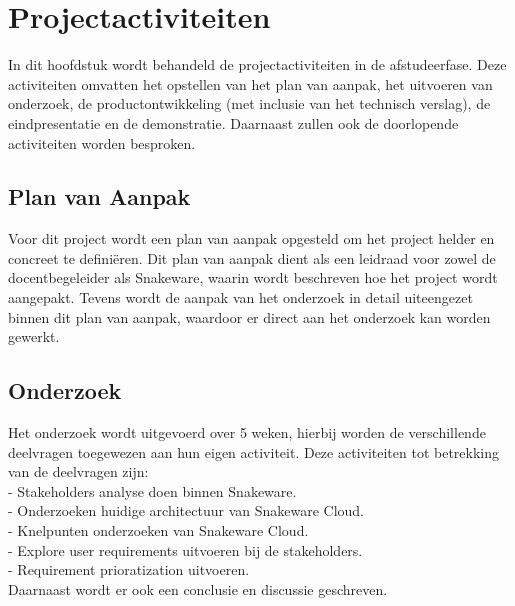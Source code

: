 \chapter{Projectactiviteiten}
In dit hoofdstuk wordt behandeld de projectactiviteiten in de afstudeerfase.
Deze activiteiten omvatten het opstellen van het plan van aanpak, het uitvoeren van onderzoek, de productontwikkeling (met inclusie van het technisch verslag), de eindpresentatie en de demonstratie.
Daarnaast zullen ook de doorlopende activiteiten worden besproken.
\section{Plan van Aanpak}
Voor dit project wordt een plan van aanpak opgesteld om het project helder en concreet te definiëren.
Dit plan van aanpak dient als een leidraad voor zowel de docentbegeleider als Snakeware, waarin wordt beschreven hoe het project wordt aangepakt.
Tevens wordt de aanpak van het onderzoek in detail uiteengezet binnen dit plan van aanpak, waardoor er direct aan het onderzoek kan worden gewerkt.
\section{Onderzoek}
Het onderzoek wordt uitgevoerd over 5 weken, hierbij worden de verschillende deelvragen toegewezen aan hun eigen activiteit.
Deze activiteiten tot betrekking van de deelvragen zijn: \\
- Stakeholders analyse doen binnen Snakeware. \\ 
- Onderzoeken huidige architectuur van Snakeware Cloud. \\
- Knelpunten onderzoeken van Snakeware Cloud. \\ 
- Explore user requirements uitvoeren bij de stakeholders. \\
- Requirement prioratization uitvoeren. \\
Daarnaast wordt er ook een conclusie en discussie geschreven.

